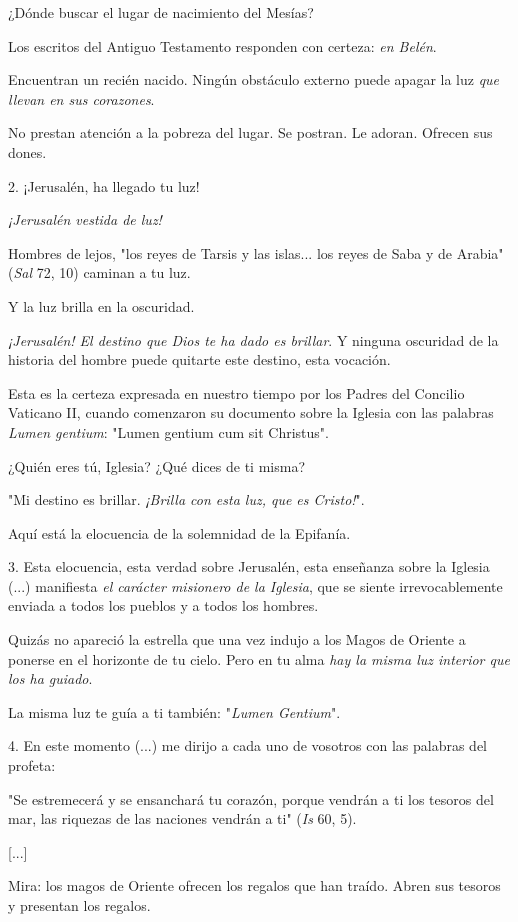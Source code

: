 ¿Dónde buscar el lugar de nacimiento del Mesías?

Los escritos del Antiguo Testamento responden con certeza: \emph{en
	Belén}.

Encuentran un recién nacido. Ningún obstáculo externo puede apagar la
luz \emph{que llevan en sus corazones}.

No prestan atención a la pobreza del lugar. Se postran. Le adoran.
Ofrecen sus dones.

2. ¡Jerusalén, ha llegado tu luz!

\emph{¡Jerusalén vestida de luz!}

Hombres de lejos, "los reyes de Tarsis y las islas... los reyes de Saba
y de Arabia" (\emph{Sal} 72, 10) caminan a tu luz.

Y la luz brilla en la oscuridad.

\emph{¡Jerusalén! El destino que Dios te ha dado es brillar}. Y ninguna
oscuridad de la historia del hombre puede quitarte este destino, esta
vocación.

Esta es la certeza expresada en nuestro tiempo por los Padres del
Concilio Vaticano II, cuando comenzaron su documento sobre la Iglesia
con las palabras \emph{Lumen gentium}: "Lumen gentium cum sit Christus".

¿Quién eres tú, Iglesia? ¿Qué dices de ti misma?

"Mi destino es brillar. \emph{¡Brilla con esta luz, que es Cristo!}".

Aquí está la elocuencia de la solemnidad de la Epifanía.

3. Esta elocuencia, esta verdad sobre Jerusalén, esta enseñanza sobre la
Iglesia (...) manifiesta \emph{el carácter misionero de la Iglesia}, que
se siente irrevocablemente enviada a todos los pueblos y a todos los
hombres.

Quizás no apareció la estrella que una vez indujo a los Magos de Oriente
a ponerse en el horizonte de tu cielo. Pero en tu alma \emph{hay la
	misma luz interior que los ha guiado}.

La misma luz te guía a ti también: "\emph{Lumen Gentium}".

4. En este momento (...) me dirijo a cada uno de vosotros con las
palabras del profeta:

"Se estremecerá y se ensanchará tu corazón, porque vendrán a ti los
tesoros del mar, las riquezas de las naciones vendrán a ti" (\emph{Is}
60, 5).

{[}...{]}

Mira: los magos de Oriente ofrecen los regalos que han traído. Abren sus
tesoros y presentan los regalos.

